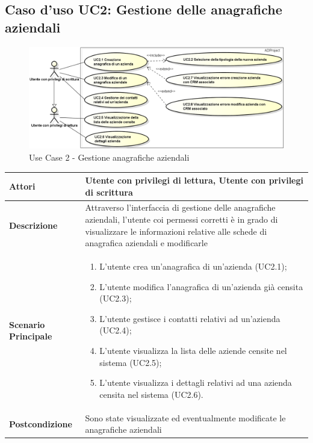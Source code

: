 	\hypertarget{UC2}{}
	\subsection{Caso d'uso UC2: Gestione delle anagrafiche aziendali}
	\begin{figure}[H]
		\centering
		\includegraphics[scale=0.50]{images/useCase/UC2}
		\caption{Use Case 2 - Gestione anagrafiche aziendali}
		\label{fig:uc2}
	\end{figure}
	\begin{longtable}{ | p{2.7cm} | p{12cm} |}
		\hline \textbf{Attori} & Utente con privilegi di lettura, Utente con privilegi di scrittura\\ 
		\hline \textbf{Descrizione} & Attraverso l’interfaccia di gestione delle anagrafiche aziendali, l’utente coi permessi corretti è in grado di visualizzare le informazioni relative alle schede di anagrafica aziendali e modificarle\\ 
		\hline \textbf{Scenario Principale} & \begin{enumerate}
			\itemsep-0.5em 
			\item L’utente crea un’anagrafica di un’azienda  (UC2.1);
			\item L’utente modifica l’anagrafica di un’azienda già censita  (UC2.3);
			\item L’utente gestisce i contatti relativi ad un’azienda  (UC2.4);
			\item L’utente visualizza la lista delle aziende censite nel sistema  (UC2.5);
			\item L’utente visualizza i dettagli relativi ad una azienda censita nel sistema  (UC2.6).
			
		\end{enumerate}
		\\ 
		\hline \textbf{Postcondizione} & Sono state visualizzate ed eventualmente modificate le anagrafiche aziendali\\ 
		\hline 
	\end{longtable}
	
